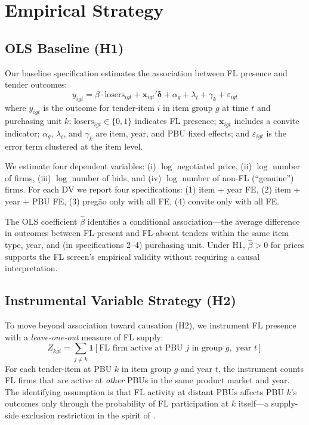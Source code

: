 \section{Empirical Strategy}
\label{sec:empirical}

\subsection{OLS Baseline (H1)}
\label{sec:empirical_ols}

Our baseline specification estimates the association between FL presence
and tender outcomes:
\begin{equation}
  y_{igt} = \beta \cdot \text{losers}_{igt} + \mathbf{x}_{igt}'
  \boldsymbol{\delta} + \alpha_g + \lambda_t + \gamma_k + \varepsilon_{igt}
  \label{eq:main}
\end{equation}
where $y_{igt}$ is the outcome for tender-item $i$ in item group $g$ at
time $t$ and purchasing unit $k$; $\text{losers}_{igt} \in \{0,1\}$
indicates FL presence; $\mathbf{x}_{igt}$ includes a convite indicator;
$\alpha_g$, $\lambda_t$, and $\gamma_k$ are item, year, and PBU fixed
effects; and $\varepsilon_{igt}$ is the error term clustered at the item
level.

We estimate four dependent variables: (i) $\log$ negotiated price, (ii)
$\log$ number of firms, (iii) $\log$ number of bids, and (iv) $\log$
number of non-FL (``genuine'') firms. For each DV we report four
specifications: (1) item + year FE, (2) item + year + PBU FE, (3)
preg\~ao only with all FE, (4) convite only with all FE.

The OLS coefficient $\hat{\beta}$ identifies a conditional
association---the average difference in outcomes between FL-present and
FL-absent tenders within the same item type, year, and (in
specifications 2--4) purchasing unit. Under H1, $\hat{\beta} > 0$ for
prices supports the FL screen's empirical validity without requiring a
causal interpretation.

\subsection{Instrumental Variable Strategy (H2)}
\label{sec:empirical_iv}

To move beyond association toward causation (H2), we instrument FL
presence with a \emph{leave-one-out} measure of FL supply:
\begin{equation}
  Z_{kgt} = \sum_{j \neq k} \mathbf{1}[\text{FL firm active at PBU } j
  \text{ in group } g, \text{ year } t]
  \label{eq:iv}
\end{equation}
For each tender-item at PBU $k$ in item group $g$ and year $t$, the
instrument counts FL firms that are active at \emph{other} PBUs in the
same product market and year. The identifying assumption is that FL
activity at distant PBUs affects PBU $k$'s outcomes only through the
probability of FL participation at $k$ itself---a supply-side exclusion
restriction in the spirit of \citet{goldsmithpinkham2020bartik}.

